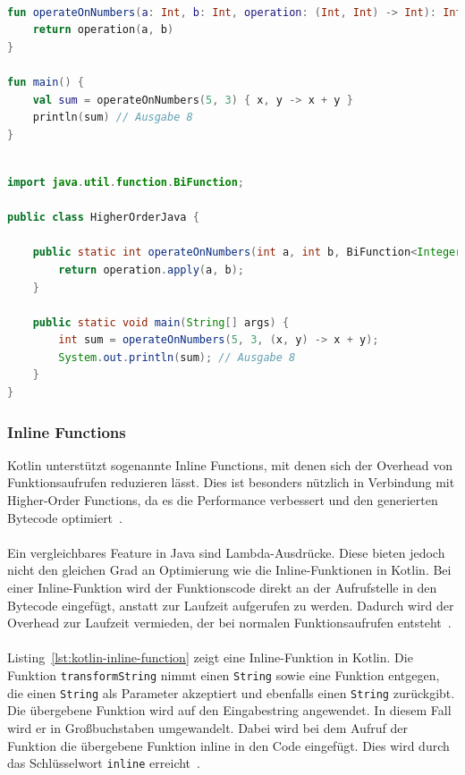 \documentclass[11pt]{article}
\begin{document}
    \begin{lstlisting}[language=Kotlin, caption={HigherOrderKotlin.kt}, label={lst:kotlin-higher-order-function}]

fun operateOnNumbers(a: Int, b: Int, operation: (Int, Int) -> Int): Int {
    return operation(a, b)
}

fun main() {
    val sum = operateOnNumbers(5, 3) { x, y -> x + y }
    println(sum) // Ausgabe 8
}
    \end{lstlisting}

    \begin{lstlisting}[language=Java, caption={HigherOrderJava.java}, label={lst:java-higher-order-function}]

import java.util.function.BiFunction;

public class HigherOrderJava {

    public static int operateOnNumbers(int a, int b, BiFunction<Integer, Integer, Integer> operation) {
        return operation.apply(a, b);
    }

    public static void main(String[] args) {
        int sum = operateOnNumbers(5, 3, (x, y) -> x + y);
        System.out.println(sum); // Ausgabe 8
    }
}
    \end{lstlisting}

    \subsubsection{Inline Functions}
    Kotlin unterstützt sogenannte Inline Functions, mit denen sich der Overhead von Funktionsaufrufen reduzieren lässt.
    Dies ist besonders nützlich in Verbindung mit Higher-Order Functions, da es die Performance verbessert und den generierten Bytecode optimiert~\cite{kotlin-inline}.\\
    \\
    Ein vergleichbares Feature in Java sind Lambda-Ausdrücke.
    Diese bieten jedoch nicht den gleichen Grad an Optimierung wie die Inline-Funktionen in Kotlin.
    Bei einer Inline-Funktion wird der Funktionscode direkt an der Aufrufstelle in den Bytecode eingefügt, anstatt zur Laufzeit aufgerufen zu werden.
    Dadurch wird der Overhead zur Laufzeit vermieden, der bei normalen Funktionsaufrufen entsteht~\cite{kotlin-inline}.\\
    \\
    Listing~\ref{lst:kotlin-inline-function} zeigt eine Inline-Funktion in Kotlin.
    Die Funktion \texttt{transformString} nimmt einen \texttt{String} sowie eine Funktion entgegen, die einen \texttt{String} als Parameter akzeptiert und ebenfalls einen \texttt{String} zurückgibt.
    Die übergebene Funktion wird auf den Eingabestring angewendet.
    In diesem Fall wird er in Großbuchstaben umgewandelt.
    Dabei wird bei dem Aufruf der Funktion die übergebene Funktion inline in den Code eingefügt.
    Dies wird durch das Schlüsselwort \texttt{inline} erreicht~\cite{kotlin-inline}.\\
    \\
\end{document}
